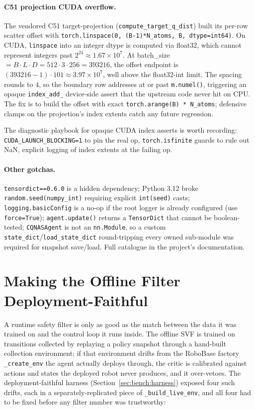 \documentclass[11pt,a4paper]{report}
\begin{document}
\paragraph{C51 projection CUDA overflow.}
The vendored C51 target-projection
(\texttt{compute\_target\_q\_dist}) built its per-row scatter
offset with \texttt{torch.linspace(0, (B-1)*N\_atoms, B,
dtype=int64)}. On CUDA, \texttt{linspace} into an integer dtype is
computed via float32, which cannot represent integers past
$2^{24} \approx 1.67 \times 10^7$. At batch\_size
$= B \cdot L \cdot D = 512 \cdot 3 \cdot 256 = 393216$, the offset
endpoint is $(393216-1) \cdot 101 \approx 3.97 \times 10^7$, well
above the float32-int limit. The spacing rounds to 4, so the
boundary row addresses at or past \texttt{m.numel()}, triggering an
opaque \texttt{index\_add\_} device-side assert that the upstream
code never hit on CPU. The fix is to build the offset with exact
\texttt{torch.arange(B) * N\_atoms}; defensive clamps on the
projection's index extents catch any future regression.

The diagnostic playbook for opaque CUDA index asserts is worth
recording: \texttt{CUDA\_LAUNCH\_BLOCKING=1} to pin the real op,
\texttt{torch.isfinite} guards to rule out NaN, explicit logging of
index extents at the failing op.

\paragraph{Other gotchas.}
\texttt{tensordict==0.6.0} is a hidden dependency; Python 3.12
broke \texttt{random.seed(numpy\_int)} requiring explicit
\texttt{int(seed)} casts; \texttt{logging.basicConfig} is a no-op
if the root logger is already configured (use \texttt{force=True});
\texttt{agent.update()} returns a \texttt{TensorDict} that cannot
be boolean-tested; \texttt{CQNASAgent} is not an \texttt{nn.Module},
so a custom \texttt{state\_dict}/\texttt{load\_state\_dict}
round-tripping every owned sub-module was required for snapshot
save/load. Full catalogue in the project's documentation.

\section{Making the Offline Filter Deployment-Faithful}
\label{sec:impl:svf-faithful}

A runtime safety filter is only as good as the match between the data
it was trained on and the control loop it runs inside. The offline SVF
is trained on transitions collected by replaying a policy snapshot
through a hand-built collection environment; if that environment drifts
from the RoboBase factory \texttt{\_create\_env} the agent actually
deploys through, the critic is calibrated against actions and states
the deployed robot never produces, and it over-vetoes. The
deployment-faithful harness (Section~\ref{sec:bench:harness}) exposed
four such drifts, each in a separately-replicated piece of
\texttt{\_build\_live\_env}, and all four had to be fixed before any
filter number was trustworthy:
\end{document}
